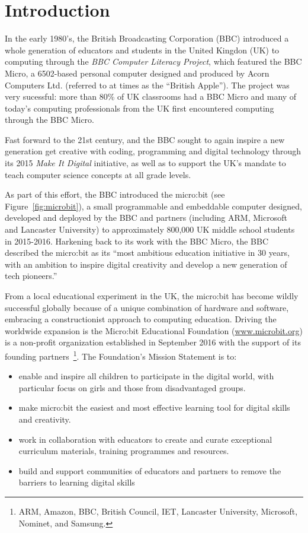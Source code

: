 \section{Introduction}
\label{sec:intrp}

In the early 1980's, the British Broadcasting Corporation (BBC)
introduced a whole generation of educators and students in the United Kingdon (UK) 
to computing through the {\em BBC Computer Literacy Project}, which featured the BBC Micro, 
a 6502-based personal computer designed and produced by Acorn Computers Ltd. (referred
to at times as the ``British Apple'').  The project was very sucessful:
more than 80\% of UK classrooms had a BBC Micro and many of today's 
computing professionals from the UK first encountered computing through
the BBC Micro.

Fast forward to the 21st century, and the BBC sought to again inspire a new
generation get creative with coding, programming and digital technology
through its 2015 {\em Make It Digital} initiative, as well as to support the UK's mandate to 
teach computer science concepts at all grade levels.~\cite{PeytonJones2013ICFP}

As part of this effort, the BBC introduced the micro:bit (see 
Figure~\ref{fig:microbit}),
a small programmable and embeddable computer designed, 
developed and deployed by the BBC and partners (including ARM, Microsoft
and Lancaster University) to approximately 800,000 UK middle school students
in 2015-2016. Harkening back to its work with the BBC Micro,
the BBC described the micro:bit as its ``most ambitious education initiative in 30 years, 
with an ambition to inspire digital creativity and 
develop a new generation of tech pioneers.''~\cite{BBCwebsite}

From a local educational experiment in the UK, the micro:bit has become
wildly successful globally because of a unique combination of hardware and
software, embracing a constructionist approach to computing education.
Driving the worldwide expansion is
the Micro:bit Educational Foundation (\url{www.microbit.org}) 
is a non-profit organization
established in September 2016 with the support of its founding partners~\footnote{ARM,
Amazon, BBC, British Council, IET, Lancaster University, Microsoft,
Nominet, and Samsung.}. 
The Foundation's Mission Statement is to: 
\begin{itemize}
\item  enable and inspire all children to participate in the digital world, 
with particular focus on girls and those from disadvantaged groups.
\item make micro:bit the easiest and most effective learning tool for digital skills and creativity.
\item work in collaboration with educators to create and curate exceptional 
curriculum materials, training programmes and resources.
\item build and support communities of educators and partners 
to remove the barriers to learning digital skills
\end{itemize}

